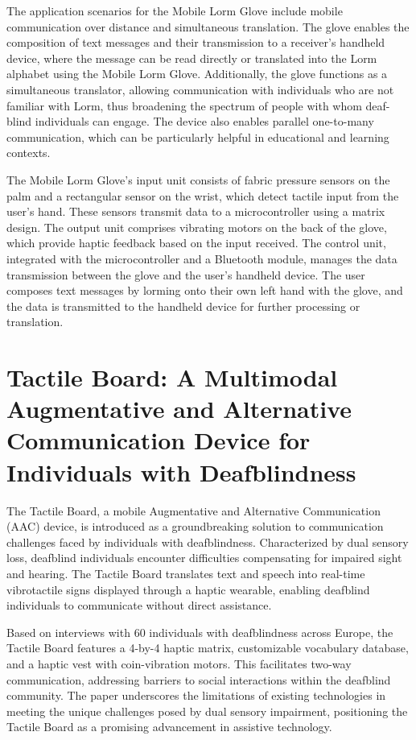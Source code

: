 \documentclass[12pt,a4paper]{report}
\begin{document}
The application scenarios for the Mobile Lorm Glove include mobile communication over distance and simultaneous translation. The glove enables the composition of text messages and their transmission to a receiver's handheld device, where the message can be read directly or translated into the Lorm alphabet using the Mobile Lorm Glove. Additionally, the glove functions as a simultaneous translator, allowing communication with individuals who are not familiar with Lorm, thus broadening the spectrum of people with whom deaf-blind individuals can engage. The device also enables parallel one-to-many communication, which can be particularly helpful in educational and learning contexts.

The Mobile Lorm Glove's input unit consists of fabric pressure sensors on the palm and a rectangular sensor on the wrist, which detect tactile input from the user's hand. These sensors transmit data to a microcontroller using a matrix design. The output unit comprises vibrating motors on the back of the glove, which provide haptic feedback based on the input received. The control unit, integrated with the microcontroller and a Bluetooth module, manages the data transmission between the glove and the user's handheld device. The user composes text messages by lorming onto their own left hand with the glove, and the data is transmitted to the handheld device for further processing or translation.

\section{Tactile Board: A Multimodal Augmentative and Alternative Communication Device for Individuals with Deafblindness}
The Tactile Board, a mobile Augmentative and Alternative Communication (AAC) device, is introduced as a groundbreaking solution to communication challenges faced by individuals with deafblindness\cite{ref3}. Characterized by dual sensory loss, deafblind individuals encounter difficulties compensating for impaired sight and hearing. The Tactile Board translates text and speech into real-time vibrotactile signs displayed through a haptic wearable, enabling deafblind individuals to communicate without direct assistance.

Based on interviews with 60 individuals with deafblindness across Europe, the Tactile Board features a 4-by-4 haptic matrix, customizable vocabulary database, and a haptic vest with coin-vibration motors. This facilitates two-way communication, addressing barriers to social interactions within the deafblind community. The paper underscores the limitations of existing technologies in meeting the unique challenges posed by dual sensory impairment, positioning the Tactile Board as a promising advancement in assistive technology.
\end{document}
